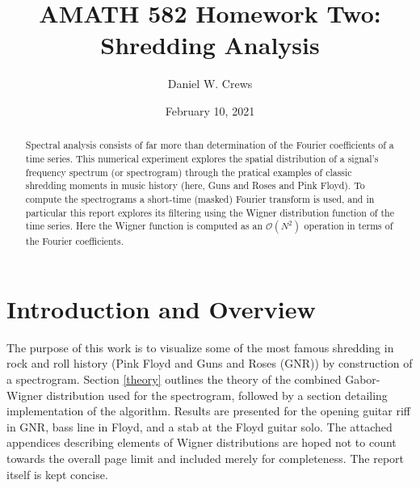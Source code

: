 \documentclass{article}
\title{AMATH 582 Homework Two: Shredding Analysis}
\author{Daniel W. Crews}
\date{February 10, 2021}
\begin{document}
\maketitle

\begin{abstract}
  Spectral analysis consists of far more than determination of the Fourier coefficients of a time series. This numerical experiment explores the spatial distribution of a signal's frequency spectrum (or spectrogram) through the pratical examples of classic shredding moments in music history (here, Guns and Roses and Pink Floyd). To compute the spectrograms a short-time (masked) Fourier transform is used, and in particular this report explores its filtering using the Wigner distribution function of the time series. Here the Wigner function is computed as an $\mathcal{O}(N^2)$ operation in terms of the Fourier coefficients.
\end{abstract}

\section{Introduction and Overview}
The purpose of this work is to visualize some of the most famous shredding in rock and roll history (Pink Floyd and Guns and Roses (GNR)) by construction of a spectrogram. Section \ref{theory} outlines the theory of the combined Gabor-Wigner distribution used for the spectrogram, followed by a section detailing implementation of the algorithm. Results are presented for the opening guitar riff in GNR, bass line in Floyd, and a stab at the Floyd guitar solo. The attached appendices describing elements of Wigner distributions are hoped not to count towards the overall page limit and included merely for completeness. The report itself is kept concise.
\end{document}
